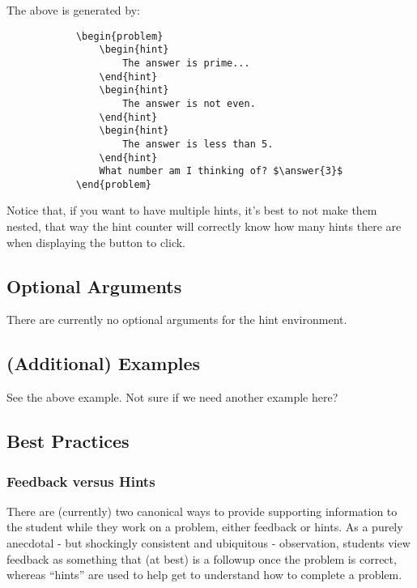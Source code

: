 \documentclass{ximera}
\begin{document}
        The above is generated by:
        
        \begin{verbatim}
            \begin{problem}
                \begin{hint}
                    The answer is prime...
                \end{hint}
                \begin{hint}
                    The answer is not even.
                \end{hint}
                \begin{hint}
                    The answer is less than 5.
                \end{hint}
                What number am I thinking of? $\answer{3}$
            \end{problem}
        \end{verbatim}
        
        Notice that, if you want to have multiple hints, it's best to not make them nested, that way the hint counter will correctly know how many hints there are when displaying the button to click.
        
        
    \subsection*{Optional Arguments}
        
        There are currently no optional arguments for the hint environment.

    \subsection*{(Additional) Examples}
    
        See the above example. Not sure if we need another example here?
        
    \subsection*{Best Practices}
    
        \subsubsection*{Feedback versus Hints}
            There are (currently) two canonical ways to provide supporting information to the student while they work on a problem, either feedback or hints. As a purely anecdotal - but shockingly consistent and ubiquitous - observation, students view feedback as something that (at best) is a followup once the problem is correct, whereas ``hints'' are used to help get to understand how to complete a problem. 
            
\end{document}
